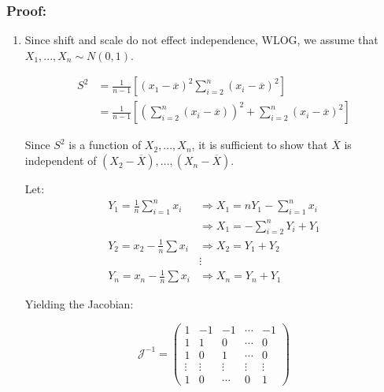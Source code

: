 \documentclass{article}
\begin{document}
\subsubsection*{Proof:}
\begin{enumerate}
    \item Since shift and scale do not effect independence, WLOG, we assume that $X_1,...,X_n \sim N(0,1)$.

    \begin{equation*}
        \begin{split}
            S^2 &= \frac{1}{n-1} \left[(x_1-\overline{x})^2 \sum_{i=2}^n (x_i-\overline{x})^2  \right]\\
            &= \frac{1}{n-1} \left[\left(\sum_{i=2}^n (x_i - \overline{x}) \right)^2 + \sum_{i=2}^n (x_i - \overline{x})^2 \right]
        \end{split}
    \end{equation*}

    Since $S^2$ is a function of $X_2,...,X_n$, it is sufficient to show that $\overline{X}$ is independent of $(X_2-\overline{X}),...,(X_n-\overline{X})$.

    Let:
    \begin{equation*}
        \begin{split}
            Y_1 = \frac{1}{n}\sum_{i=1}^n x_i &\Rightarrow X_1 = n Y_1- \sum_{i=1}^n x_i\\
            &\Rightarrow X_1 = -\sum_{i=2}^n Y_i + Y_1\\
            Y_2 = x_2 - \frac{1}{n}\sum x_i &\Rightarrow X_2 = Y_1 + Y_2\\
            &\vdots\\
            Y_n = x_n - \frac{1}{n}\sum x_i &\Rightarrow X_n = Y_n + Y_1
        \end{split}
    \end{equation*}

    Yielding the Jacobian:

    \begin{equation*}
        \mathcal{J}^{-1} = \begin{pmatrix}
        1 & -1 & -1 & \cdots & -1\\
        1 & 1 & 0 & \cdots & 0\\
        1 & 0 & 1 & \cdots & 0\\
        \vdots & \vdots & \vdots & \vdots & \vdots\\
        1 & 0 & \cdots & 0 & 1
        \end{pmatrix}
    \end{equation*}


\end{enumerate}
\end{document}
